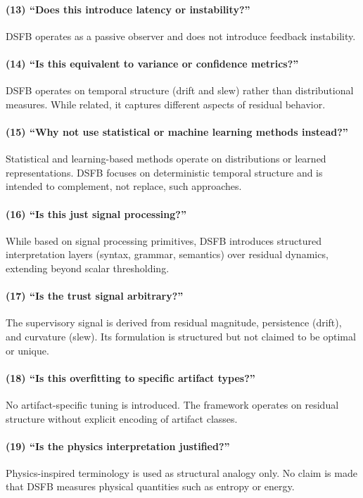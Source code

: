 \documentclass[11pt,letterpaper]{article}
\theoremstyle{gcresult}
\theoremstyle{definition}
\begin{document}
\paragraph{(13) ``Does this introduce latency or instability?''}
DSFB operates as a passive observer and does not introduce feedback instability.

\paragraph{(14) ``Is this equivalent to variance or confidence metrics?''}
DSFB operates on temporal structure (drift and slew) rather than distributional measures. While related, it captures different aspects of residual behavior.

\paragraph{(15) ``Why not use statistical or machine learning methods instead?''}
Statistical and learning-based methods operate on distributions or learned representations. DSFB focuses on deterministic temporal structure and is intended to complement, not replace, such approaches.

\paragraph{(16) ``Is this just signal processing?''}
While based on signal processing primitives, DSFB introduces structured interpretation layers (syntax, grammar, semantics) over residual dynamics, extending beyond scalar thresholding.

\paragraph{(17) ``Is the trust signal arbitrary?''}
The supervisory signal is derived from residual magnitude, persistence (drift), and curvature (slew). Its formulation is structured but not claimed to be optimal or unique.

\paragraph{(18) ``Is this overfitting to specific artifact types?''}
No artifact-specific tuning is introduced. The framework operates on residual structure without explicit encoding of artifact classes.

\paragraph{(19) ``Is the physics interpretation justified?''}
Physics-inspired terminology is used as structural analogy only. No claim is made that DSFB measures physical quantities such as entropy or energy.
\end{document}
